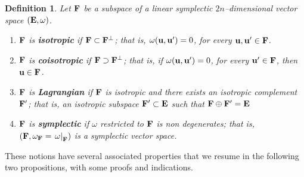 \documentclass[12pt]{report}
\newtheorem{definition}[teor]{Definition}
\begin{document}
\begin{definition}
Let ${\bf F}$ be a subspace of a linear symplectic $2n$--dimensional vector space $({\bf E},\omega)$. 
\begin{enumerate}
\item $ {\bf F}$ is \textbf{isotropic} if ${\bf F}\subset  {\bf F}^\bot$; that is, $\omega({\bf u},{\bf u}')=0$, for every ${\bf u},{\bf u}'\in{\bf F}$.
\item $ {\bf F}$ is \textbf{coisotropic} if ${\bf F}\supset  {\bf F}^\bot$; that is, if 
$\omega({\bf u},{\bf u}')=0$, for every ${\bf u}'\in{\bf F}$, then ${\bf u}\in{\bf F}$.
\item $ {\bf F}$ is \textbf{Lagrangian} if ${\bf F}$ is isotropic and there exists an isotropic complement ${\bf F}'$; that is, an isotropic subspace ${\bf F}'\subset{\bf E}$ such that ${\bf F}\oplus{\bf F}'={\bf E}$
\item $ {\bf F}$ is \textbf{symplectic} if $\omega$ restricted to ${\bf F}$ is non degenerates; that is, $({\bf F},\omega_{\bf F}=\left.\omega\right|_{\bf F})$ is a symplectic vector space.
\end{enumerate}
\end{definition}

These notions have several associated properties that we resume in the following two propositions, with some proofs and indications. 
\end{document}

